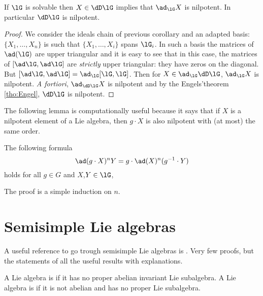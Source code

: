 \begin{corollary}
If $\lG$ is solvable then $X\in\dD\lG$ implies that $\ad_{\lG}X$ is nilpotent. In particular $\dD\lG$ is nilpotent.
\end{corollary}

\begin{proof}
We consider the ideals chain of previous corollary and an adapted basis: $\{X_1,\ldots,X_n\}$ is such that $\{X_1,\ldots,X_i\}$ spans $\lG_i$. In such a basis the matrices of $\ad(\lG)$ are upper triangular and it is easy to see that in this case, the matrices of $[\ad\lG,\ad\lG]$ are \emph{strictly} upper triangular: they have zeros on the diagonal. But $[\ad\lG,\ad\lG]=\ad_{\lG}[\lG,\lG]$. Then for $X\in\ad_{\lG}\dD\lG$, $\ad_{\lG}X$ is nilpotent. \emph{A fortiori}, $\ad_{\dD\lG}X$ is nilpotent and by the Engels'theorem \ref{tho:Engel}, $\dD\lG$ is nilpotent.
\end{proof}

The following lemma is computationally useful because it says that if $X$ is a nilpotent element of a Lie algebra, then $g\cdot X$ is also nilpotent with (at most) the same order.

\begin{lemma}
  The following formula
\begin{equation}
\ad(g\cdot X)^nY=g\cdot \ad(X)^n(g^{-1}\cdot Y)
\end{equation}
holds for all $g\in G$ and $X$,$Y\in\lG$,
\label{lem:nil_Ad}
\end{lemma}

The proof is a simple induction on $n$.

\section{Semisimple Lie algebras}

A useful reference to go trough semisimple Lie algebras is \cite{Wisser}. Very few proofs, but the statements of all the useful results with explanations.

\begin{definition}
    A Lie algebra is  if it has no proper abelian invariant Lie subalgebra. A Lie algebra is  if it is not abelian and has no proper Lie subalgebra.
\end{definition}

